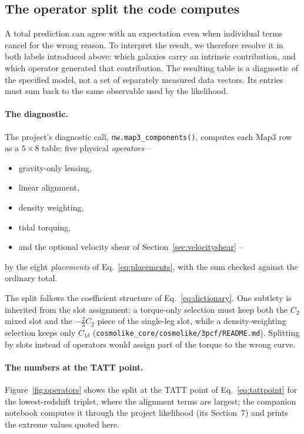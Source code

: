 \documentclass[11pt]{article}
\newcommand{\us}{\_\allowbreak}
\numberwithin{equation}{section}
\begin{document}
\subsection{The operator split the code computes}
\label{sec:operatorsplit}

A total prediction can agree with an expectation even when individual
terms cancel for the wrong reason. To interpret the result, we therefore
resolve it in both labels introduced above: which galaxies carry an
intrinsic contribution, and which operator generated that contribution.
The resulting table is a diagnostic of the specified model, not a set of
separately measured data vectors. Its entries must sum back to the same
observable used by the likelihood.

\paragraph{The diagnostic.}
The project's diagnostic call, \texttt{nw.map3\us components()},
computes each Map3 row as a $5 \times 8$ table: five physical
\emph{operators} --
\begin{itemize}
  \item gravity-only lensing,
  \item linear alignment,
  \item density weighting,
  \item tidal torquing,
  \item and the optional velocity shear of
    Section~\ref{sec:velocityshear} --
\end{itemize}
by the eight \emph{placements} of Eq.~\eqref{eq:placements}, with
the sum checked against the ordinary total.

The split follows the coefficient structure of
Eq.~\eqref{eq:dictionary}.  One subtlety is inherited from the slot
assignment: a torque-only selection must keep both the $C_2$ mixed
slot and the $-\tfrac{2}{3}C_2$ piece of the single-leg slot, while
a density-weighting selection keeps only $C_{1\delta}$
(\texttt{cosmolike\us core/cosmolike/3pcf/README.md}).  Splitting by
slots instead of operators would assign part of the torque to the
wrong curve.

\paragraph{The numbers at the TATT point.}
Figure~\ref{fig:operators} shows the split at the TATT point of
Eq.~\eqref{eq:tattpoint} for the lowest-redshift triplet, where the
alignment terms are largest; the companion notebook computes it
through the project likelihood (its Section~7) and prints the
extreme values quoted here.
\end{document}
